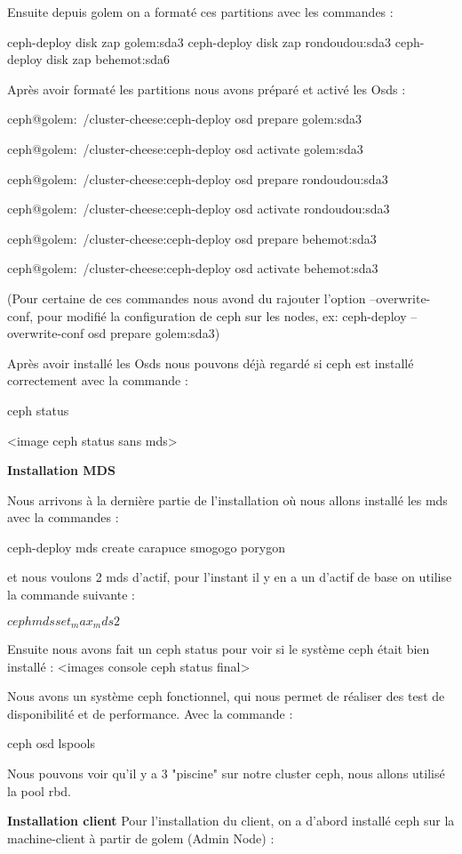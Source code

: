 \documentclass{article}
\begin{document}
Ensuite depuis golem on a formaté ces partitions avec les commandes :

ceph-deploy disk zap golem:sda3
ceph-deploy disk zap rondoudou:sda3
ceph-deploy disk zap behemot:sda6

Après avoir formaté les partitions nous avons préparé et activé les Osds :

ceph@golem:~/cluster-cheese:ceph-deploy osd prepare golem:sda3

ceph@golem:~/cluster-cheese:ceph-deploy osd activate golem:sda3

ceph@golem:~/cluster-cheese:ceph-deploy osd prepare rondoudou:sda3

ceph@golem:~/cluster-cheese:ceph-deploy osd activate rondoudou:sda3

ceph@golem:~/cluster-cheese:ceph-deploy osd prepare behemot:sda3

ceph@golem:~/cluster-cheese:ceph-deploy osd activate behemot:sda3

(Pour certaine de ces commandes nous avond du rajouter l'option --overwrite-conf, pour modifié la configuration de ceph sur les nodes, 
ex: ceph-deploy --overwrite-conf osd prepare golem:sda3)

Après avoir installé les Osds nous pouvons déjà regardé si ceph est installé correctement avec la commande :

ceph status

<image ceph status sans mds>

\textbf{Installation MDS}

Nous arrivons à la dernière partie de l'installation où nous allons installé les mds avec la commandes :

ceph-deploy mds create carapuce smogogo porygon

et nous voulons 2 mds d'actif, pour l'instant il y en a un d'actif de base on utilise la commande suivante :

$ceph mds set_max_mds 2$

Ensuite nous avons fait un ceph status pour voir si le système ceph était bien installé :
<images console ceph status final>

Nous avons un système ceph fonctionnel, qui nous permet de réaliser des test de disponibilité et de performance.
Avec la commande :

ceph osd lspools

Nous pouvons voir qu'il y a 3 "piscine" sur notre cluster ceph, nous allons utilisé la pool rbd.

\textbf{Installation client}
Pour l'installation du client, on a d'abord installé ceph sur la machine-client à partir de golem (Admin Node) :
\end{document}
